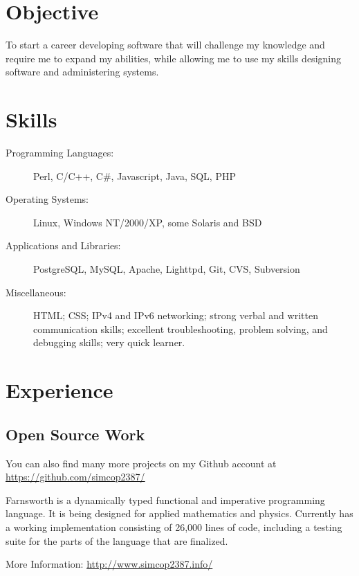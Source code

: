 \documentclass[table,tmargin=1in,bmargin=1in,letterpaper]{resume}
\author{Ryan Voots}
\begin{document}
\maketitle
\vspace{0.1in}

\section{Objective}
To start a career developing software that will challenge my knowledge and require me to expand my abilities, while allowing me to use my skills designing software and administering systems.

\section{Skills}
\begin{description}
\item[Programming Languages:]
Perl, C/C++, C\#, Javascript, Java, SQL, PHP
\item[Operating Systems:]
Linux, Windows NT/2000/XP, some Solaris and BSD
\item[Applications and Libraries:]
PostgreSQL, MySQL, Apache, Lighttpd, Git, CVS, Subversion
\item[Miscellaneous:]
HTML; CSS; IPv4 and IPv6 networking; strong verbal and written communication skills; excellent troubleshooting, problem solving, and debugging skills; very quick learner.
\end{description}

\section{Experience}

\subsection{Open Source Work}

\begin{compactitem}
\item You can also find many more projects on my Github account at \url{https://github.com/simcop2387/}
\end{compactitem}


\begin{compactitem}
\item Farnsworth is a dynamically typed functional and imperative programming language.  
It is being designed for applied mathematics and physics.  Currently has a working implementation 
consisting of 26,000 lines of code, including a testing suite for the parts of the language that are finalized.
\item More Information: \url{http://www.simcop2387.info/}
\end{compactitem}
\end{document}
